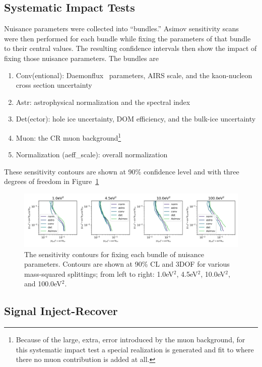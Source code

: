 \documentclass[main.tex]{subfiles}
\begin{document}
\subsection{Systematic Impact Tests}

Nuisance parameters were collected into ``bundles.'' 
Asimov sensitivity scans~\cite{Cowan_2011} were then performed for each bundle while fixing the parameters of that bundle to their central values.
The resulting confidence intervals then show the impact of fixing those nuisance parameters. 
The bundles are 
\begin{enumerate}
    \item Conv(entional): Daemonflux~\cite{yanez2023daemonflux} parameters, AIRS scale, and the kaon-nucleon cross section uncertainty
    \item Astr: astrophysical normalization and the spectral index
    \item Det(ector): hole ice uncertainty, DOM efficiency, and the bulk-ice uncertainty
    \item Muon: the CR muon background\footnote{Because of the large, extra, error introduced by the muon background, for this systematic impact test a special realization is generated and fit to where there no muon contribution is added at all.}
    \item Normalization (aeff\_scale): overall normalization
\end{enumerate}
These sensitivity contours are shown at 90\% confidence level and with three degrees of freedom in Figure~\ref{fig:impact}

\begin{figure}
    \centering
    \includegraphics[width=0.90\linewidth]{figures/systematic_impact.png}
    \caption{The sensitivity contours for fixing each bundle of nuisance parameters. Contours are shown at 90\% CL and 3DOF for various mass-squared splittings; from left to right: 1.0eV$^{2}$, 4.5eV$^{2}$, 10.0eV$^{2}$, and 100.0eV$^{2}$.}\label{fig:impact}
\end{figure}

\subsection{Signal Inject-Recover}
\end{document}
